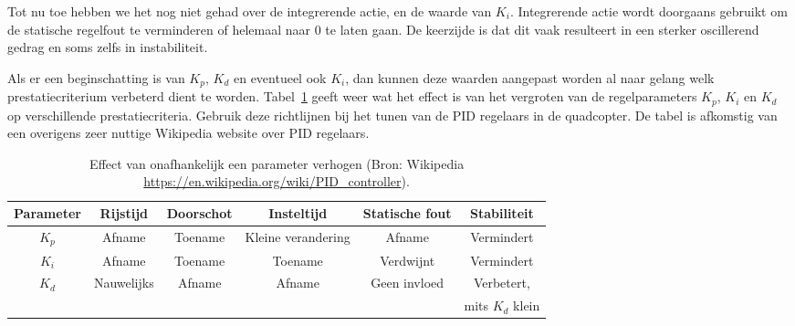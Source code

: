 \documentclass[a4paper,11pt]{article}
\begin{document}
Tot nu toe hebben we het nog niet gehad over de integrerende actie, en de
waarde van $K_i$. Integrerende actie wordt doorgaans gebruikt om de statische
regelfout te verminderen of helemaal naar 0 te laten gaan. De keerzijde is dat
dit vaak resulteert in een sterker oscillerend gedrag en soms zelfs in
instabiliteit.

Als er een beginschatting is van $K_p$, $K_d$ en eventueel ook $K_i$, dan
kunnen deze waarden aangepast worden al naar gelang welk prestatiecriterium
verbeterd dient te worden. Tabel~\ref{tab:effect} geeft weer wat het effect is
van het vergroten van de regelparameters $K_p$, $K_i$ en $K_d$ op
verschillende prestatiecriteria. Gebruik deze richtlijnen bij het tunen van de
PID regelaars in de quadcopter. De tabel is afkomstig van een overigens zeer nuttige
Wikipedia website over PID regelaars.
\begin{table}
  \centering
  \caption{Effect van onafhankelijk een parameter verhogen (Bron: Wikipedia
  \url{https://en.wikipedia.org/wiki/PID_controller}).}
  \label{tab:effect}
  \begin{tabular}{c|ccccc}
    \hline\hline
    Parameter & Rijstijd  & Doorschot & Insteltijd & Statische fout &
    Stabiliteit\\
    \hline
    $K_p$ & Afname & Toename & Kleine verandering & Afname & Vermindert\\
    $K_i$ & Afname & Toename & Toename & Verdwijnt & Vermindert \\
    $K_d$ & Nauwelijks & Afname & Afname & Geen invloed & Verbetert,\\  & & &
          & & mits $K_d$ klein\\
\hline\hline
  \end{tabular}
\end{table}
\end{document}
